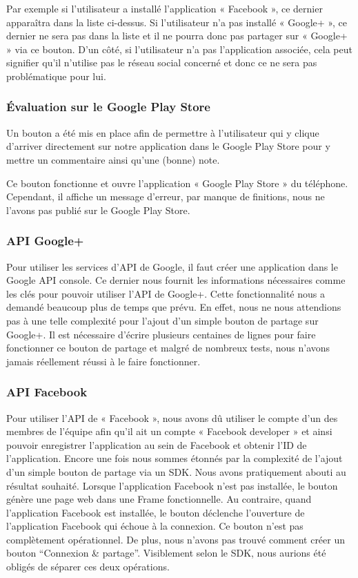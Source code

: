 \documentclass{report}
\begin{document}
Par exemple si l’utilisateur a installé l’application « Facebook », ce
dernier apparaîtra dans la liste ci-dessus. Si l’utilisateur n’a pas
installé « Google+ », ce dernier ne sera pas dans la liste et il ne
pourra donc pas partager sur « Google+ » via ce bouton. D’un côté, si
l’utilisateur n’a pas l’application associée, cela peut signifier qu’il
n’utilise pas le réseau social concerné et donc ce ne sera pas
problématique pour lui.

\subsubsection{Évaluation sur le Google Play Store}

Un bouton a été mis en place afin de permettre à l’utilisateur qui y
clique d’arriver directement sur notre application dans le Google Play
Store pour y mettre un commentaire ainsi qu’une (bonne) note.

Ce bouton fonctionne et ouvre l’application « Google Play Store » du
téléphone. Cependant, il affiche un message d’erreur, par manque de
finitions, nous ne l’avons pas publié sur le Google Play Store.

\subsubsection{API Google+}

Pour utiliser les services d’API de Google, il faut créer une
application dans le Google API console. Ce dernier nous fournit les
informations nécessaires comme les clés pour pouvoir utiliser l’API de
Google+. Cette fonctionnalité nous a demandé beaucoup plus de temps que
prévu. En effet, nous ne nous attendions pas à une telle complexité pour
l’ajout d’un simple bouton de partage sur Google+. Il est nécessaire
d’écrire plusieurs centaines de lignes pour faire fonctionner ce bouton
de partage et malgré de nombreux tests, nous n’avons jamais réellement
réussi à le faire fonctionner.

\subsubsection{API Facebook}

Pour utiliser l’API de « Facebook », nous avons dû utiliser le compte
d’un des membres de l’équipe afin qu’il ait un compte « Facebook
developer » et ainsi pouvoir enregistrer l’application au sein de
Facebook et obtenir l’ID de l’application. Encore une fois nous sommes
étonnés par la complexité de l’ajout d’un simple bouton de partage via un
SDK. Nous avons pratiquement abouti au résultat souhaité. Lorsque
l’application Facebook n’est pas installée, le bouton génère une page
web dans une Frame fonctionnelle. Au contraire, quand l’application
Facebook est installée, le bouton déclenche l’ouverture de l’application
Facebook qui échoue à la connexion. Ce bouton n’est pas complètement
opérationnel. De plus, nous n’avons pas trouvé comment créer un bouton
“Connexion \& partage”. Visiblement selon le SDK, nous aurions été
obligés de séparer ces deux opérations.
\end{document}

